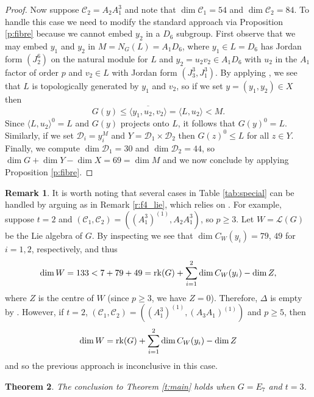 \documentclass[twoside,a4paper,reqno,11pt]{amsart}
\newcommand{\<}{\langle}
\renewcommand{\>}{\rangle}
\newcommand{\la}{\langle}
\newcommand{\ra}{\rangle}
\newcommand{\leqs}{\leqslant}
\newcommand{\geqs}{\geqslant}
\renewcommand{\:}{\colon}
\theoremstyle{plain}
\newtheorem{thm}{Theorem}[section]
\theoremstyle{definition}
\newtheorem{rem}[thm]{Remark}
\begin{document}
\begin{proof}
Now suppose $\mathcal{C}_2 = A_2A_1^3$ and note that $\dim \mathcal{C}_1 = 54$ and $\dim \mathcal{C}_2 = 84$. To handle this case we need to modify the standard approach via Proposition \ref{p:fibre} because we cannot embed $y_2$ in a $D_6$ subgroup. First observe that we may embed $y_1$ and $y_2$ in $M = N_G(L) = A_1D_6$, where $y_1 \in L = D_6$ has Jordan form $(J_2^6)$ on the natural module for $L$ and $y_2 = u_2v_2 \in A_1D_6$ with $u_2$ in the $A_1$ factor of order $p$ and $v_2 \in L$ with Jordan form $(J_3^3,J_1^3)$. By applying \cite[Theorem 7]{BGG2}, we see that $L$ is topologically generated by $y_1$ and $v_2$, so if we set $y = (y_1,y_2) \in X$ then
\[
G(y) \leqs \overline{\la y_1,u_2,v_2 \ra} = \la L, u_2 \ra < M.
\]
Since $\la L, u_2 \ra^0 = L$ and $G(y)$ projects onto $L$, it follows that $G(y)^0 = L$. Similarly, if we set $\mathcal{D}_i = y_i^M$ and $Y = \mathcal{D}_1 \times \mathcal{D}_2$ then $G(z)^0 \leqs L$ for all $z \in Y$. Finally, we compute $\dim \mathcal{D}_1 = 30$ and $\dim \mathcal{D}_2 = 44$, so $\dim G + \dim Y - \dim X = 69 = \dim M$ and we now conclude by applying Proposition \ref{p:fibre}.
\end{proof}

\begin{rem}\label{r:e7_lie}
It is worth noting that several cases in Table \ref{tab:special} can be handled by arguing as in Remark \ref{r:f4_lie}, which relies on \cite[Corollary 3.20]{BGG2}. For example, suppose $t=2$ and $(\mathcal{C}_1,\mathcal{C}_2) = ((A_1^3)^{(1)}, A_2A_1^3)$, so $p \geqs 3$. Let $W = \mathcal{L}(G)$ be the Lie algebra of $G$. By inspecting \cite[Table 8]{Law1} we see that $\dim C_W(y_i) = 79$, $49$ for $i=1,2$, respectively, and thus 
\[
\dim W =133 < 7+79+49 = {\rm rk}(G) + \sum_{i=1}^2\dim C_W(y_i) - \dim Z,
\]
where $Z$ is the centre of $W$ (since $p \geqs 3$, we have $Z=0$). Therefore, $\Delta$ is empty by \cite[Corollary 3.20]{BGG2}. However, if $t=2$, $(\mathcal{C}_1,\mathcal{C}_2) = ((A_1^3)^{(1)}, (A_3A_1)^{(1)})$ and $p \geqs 5$, then 
\[
\dim W = {\rm rk}(G) + \sum_{i=1}^2\dim C_W(y_i) -\dim Z
\]
and so the previous approach is inconclusive in this case.
\end{rem}

\begin{thm}\label{t:e7_3}
The conclusion to Theorem \ref{t:main} holds when $G = E_7$ and $t=3$. 
\end{thm}
\end{document}
